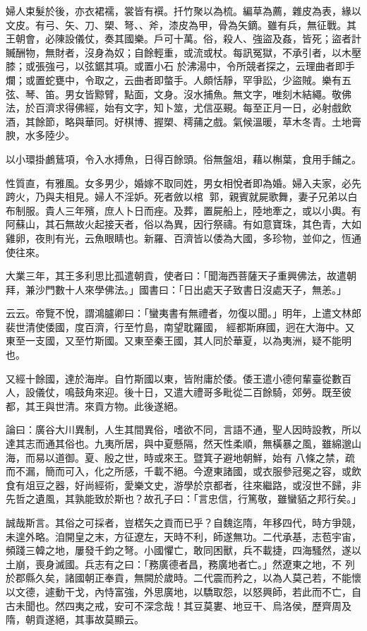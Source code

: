 \begin{pinyinscope}
 婦人束髮於後，亦衣裙襦，裳皆有襈。扦竹聚以為梳。編草為薦，雜皮為表，緣以文皮。有弓、矢、刀、槊、弩、、斧，漆皮為甲，骨為矢鏑。雖有兵，無征戰。其王朝會，必陳設儀仗，奏其國樂。戶可十萬。俗，殺人、強盜及姦，皆死；盜者計贓酬物，無財者，沒身為奴；自餘輕重，或流或杖。每訊冤獄，不承引者，以木壓膝；或張強弓，以弦鋸其項。或置小石
 於沸湯中，令所競者探之，云理曲者即手爛；或置蛇甕中，令取之，云曲者即螫手。人頗恬靜，罕爭訟，少盜賊。樂有五弦、琴、笛。男女皆黥臂，點面，文身。沒水捕魚。無文字，唯刻木結繩。敬佛法，於百濟求得佛經，始有文字，知卜筮，尤信巫覡。每至正月一日，必射戲飲酒，其餘節，略與華同。好棋博、握槊、樗蒱之戲。氣候溫暖，草木冬青。土地膏腴，水多陸少。



 以小環掛鸕鶿項，令入水搏魚，日得百餘頭。俗無盤俎，藉以槲葉，食用手餔之。



 性質直，有雅風。女多男少，婚嫁不取同姓，男女相悅者即為婚。婦入夫家，必先跨火，乃與夫相見。婦人不淫妒。死者斂以棺
 郭，親賓就屍歌舞，妻子兄弟以白布制服。貴人三年殯，庶人卜日而痤。及葬，置屍船上，陸地牽之，或以小輿。有阿蘇山，其石無故火起接天者，俗以為異，因行祭禱。有如意寶珠，其色青，大如雞卵，夜則有光，云魚眼睛也。新羅、百濟皆以倭為大國，多珍物，並仰之，恆通使往來。



 大業三年，其王多利思比孤遣朝貢，使者曰：「聞海西菩薩天子重興佛法，故遣朝拜，兼沙門數十人來學佛法。」國書曰：「日出處天子致書日沒處天子，無恙。」



 云云。帝覽不悅，謂鴻臚卿曰：「蠻夷書有無禮者，勿復以聞。」明年，上遣文林郎裴世清使倭國，度百濟，行至竹島，南望耽羅國，
 經都斯麻國，迥在大海中。又東至一支國，又至竹斯國。又東至秦王國，其人同於華夏，以為夷洲，疑不能明也。



 又經十餘國，達於海岸。自竹斯國以東，皆附庸於倭。倭王遣小德何輩臺從數百人，設儀仗，鳴鼓角來迎。後十日，又遣大禮哥多毗從二百餘騎，郊勞。既至彼都，其王與世清。來貢方物。此後遂絕。



 論曰：廣谷大川異制，人生其間異俗，嗜欲不同，言語不通，聖人因時設教，所以達其志而通其俗也。九夷所居，與中夏懸隔，然天性柔順，無橫暴之風，雖綿邈山海，而易以道御。夏、殷之世，時或來王。暨箕子避地朝鮮，始有
 八條之禁，疏而不漏，簡而可入，化之所感，千載不絕。今遼東諸國，或衣服參冠冕之容，或飲食有俎豆之器，好尚經術，愛樂文史，游學於京都者，往來繼路，或沒世不歸，非先哲之遺風，其孰能致於斯也？故孔子曰：「言忠信，行篤敬，雖蠻貊之邦行矣。」



 誠哉斯言。其俗之可採者，豈楛矢之貢而已乎？自魏迄隋，年移四代，時方爭競，未遑外略。洎開皇之末，方征遼左，天時不利，師遂無功。二代承基，志苞宇宙，頻踐三韓之地，屢發千鈞之弩。小國懼亡，敢同困獸，兵不載捷，四海騷然，遂以土崩，喪身滅國。兵志有之曰：「務廣德者昌，務廣地者亡。」然遼東之地，不
 列於郡縣久矣，諸國朝正奉貢，無闕於歲時。二代震而矜之，以為人莫己若，不能懷以文德，遽動干戈，內恃富強，外思廣地，以驕取怨，以怒興師，若此而不亡，自古未聞也。然四夷之戒，安可不深念哉！其豆莫婁、地豆干、烏洛侯，歷齊周及隋，朝貢遂絕，其事故莫顯云。



\end{pinyinscope}